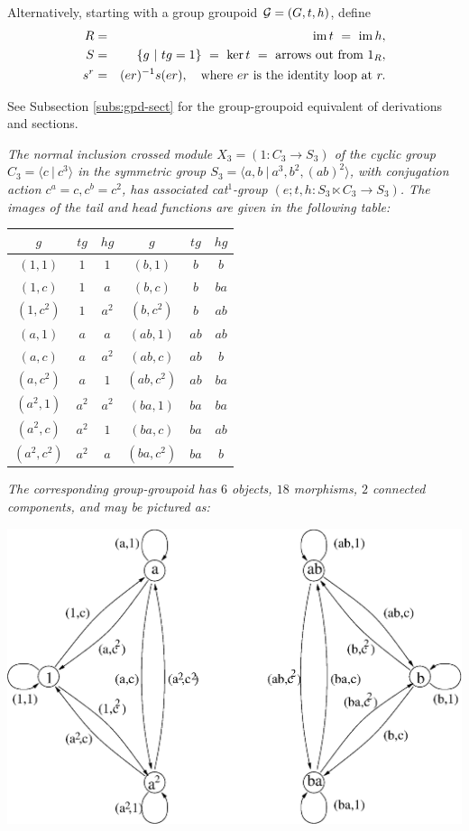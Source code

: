 Alternatively, starting with a group groupoid $\mathcal{G} = (G,t,h)$, define
\begin{eqnarray*}
  R & = & \mathrm{im}\, t ~=~ \mathrm{im}\, h, \\
  S & = & \{g ~|~ tg = 1\} ~=~ \ker t ~=~ \mbox{arrows out from}~ 1_R, \\
s^r & = & (er)^{-1}s(er), 
\quad\text{where}~ er ~\text{is the identity loop at}~ r.
\end{eqnarray*}

\bigskip\noindent
See Subsection \ref{subs:gpd-sect} for the group-groupoid 
equivalent of derivations and sections.


\bigskip
\begin{example}
\emph{The normal inclusion crossed module $X_3 = (1 : C_3 \to S_3)$ 
of the cyclic group $C_3 = \langle c ~|~ c^3 \rangle$ 
in the symmetric group $S_3 = \langle a,b ~|~ a^3, b^2, (ab)^2 \rangle$,
with conjugation action $c^a=c, c^b=c^2$,
has associated cat$^1$-group $(e;t,h : S_3 \ltimes C_3 \to S_3)$.
The images of the tail and head functions are given in the following table:}
\begin{center}
\begin{tabular}{|ccc|ccc|}
\hline
$g$ & $tg$ & $hg$ & $g$ & $tg$ & $hg$ \\
\hline
$(1,1)$ & $1$ & $1$ &        $(b,1)$ & $b$ & $b$ \\
$(1,c)$ & $1$ & $a$ &        $(b,c)$ & $b$ & $ba$ \\
$(1,c^2)$ & $1$ & $a^2$ &    $(b,c^2)$ & $b$ & $ab$ \\
$(a,1)$ & $a$ & $a$ &        $(ab,1)$ & $ab$ & $ab$ \\
$(a,c)$ & $a$ & $a^2$ &      $(ab,c)$ & $ab$ & $b$ \\
$(a,c^2)$ & $a$ & $1$ &      $(ab,c^2)$ & $ab$ & $ba$ \\
$(a^2,1)$ & $a^2$ & $a^2$ &  $(ba,1)$ & $ba$ & $ba$ \\
$(a^2,c)$ & $a^2$ & $1$ &    $(ba,c)$ & $ba$ & $ab$ \\
$(a^2,c^2)$ & $a^2$ & $a$ &  $(ba,c^2)$ & $ba$ & $b$ \\
\hline
\end{tabular}
\end{center}
\emph{The corresponding group-groupoid has $6$ objects, $18$ morphisms, 
$2$ connected components, and may be pictured as:}
\begin{center}
\includegraphics[scale = 0.65]{xmodcat1/s3ggpd.eps}

\end{center}
\end{example}

